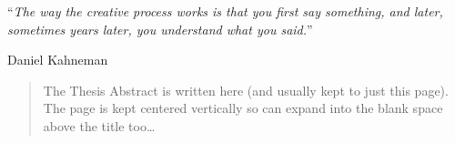 \documentclass[
11pt, %
english, %
onehalfspacing, %
headsepline, %
chapterinoneline, %
]{MastersDoctoralThesis} %
\begin{document}
\noindent\enquote{\itshape The way the creative process works is that you first say something, and later, sometimes years later, you understand what you said.}\bigbreak

\hfill Daniel Kahneman


\begin{abstract}
\addchaptertocentry{\abstractname} %
The Thesis Abstract is written here (and usually kept to just this page). The page is kept centered vertically so can expand into the blank space above the title too\ldots
\end{abstract}


\begin{acknowledgements}
\addchaptertocentry{\acknowledgementname} %



\end{acknowledgements}




\end{document}
